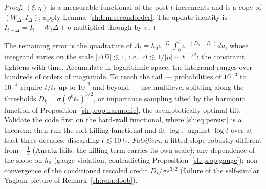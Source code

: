 \documentclass[11pt]{article}
\numberwithin{equation}{section}
\theoremstyle{plain}
\theoremstyle{definition}
\theoremstyle{remark}
\newcommand{\PP}{\mathbb{P}}
\begin{document}
\begin{proof}
$(\xi,\eta)$ is a measurable functional of the post-$t$ increments and is a
copy of $(W_\Delta,I_\Delta)$; apply Lemma~\ref{sh:lem:secondorder}. The
update identity is
$I_{t+\Delta}=I_t+W_t\Delta+\eta$ multiplied through by $\sigma$.
\end{proof}

The remaining error is the quadrature of
$\Lambda_t=h_0e^{-D_0}\int_0^te^{-(D_u-D_0)}du$, whose integrand varies on
the scale $|\Delta D|\lesssim1$, i.e.\ $\Delta\lesssim1/|\mu|\sim
t^{-1/2}$: the constraint tightens with time. Accumulate in logarithmic
space; the integrand ranges over hundreds of orders of magnitude. To reach
the tail --- probabilities of $10^{-3}$ to $10^{-4}$ require
$t/t_*$ up to $10^{12}$ and beyond --- use multilevel splitting along the
thresholds $D_k=\sigma(\theta^kt_*)^{3/2}$, or importance sampling tilted
by the harmonic function of Proposition~\ref{sh:prop:harmonic}, the
asymptotically optimal tilt. Validate the code first on the hard-wall
functional, where \eqref{sh:eq:persist} is a theorem; then run the
soft-killing functional and fit $\log\PP$ against $\log t$ over at least
three decades, discarding $t\lesssim10\,t_*$.
\emph{Falsifiers:} a fitted slope robustly different from $-\tfrac14$
(Ansatz fails: the killing term carries its own scale); any dependence of
the slope on $h_0$ (gauge violation, contradicting
Proposition~\ref{sh:prop:gauge}); non-convergence of the conditioned
rescaled credit $D_s/\sigma s^{3/2}$ (failure of the self-similar Yaglom
picture of Remark~\ref{sh:rem:doob}).
\end{document}
